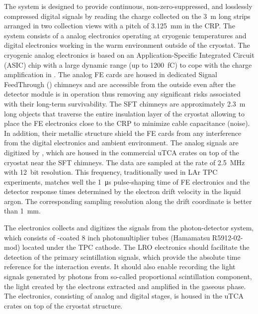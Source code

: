 The  system is designed to provide continuous, non-zero-suppressed, and losslessly compressed digital signals by reading the charge collected on the \SI{3}{m} long strips arranged in two collection views with a pitch of \SI{3.125}{mm} in the CRP. The system consists of a  analog electronics operating at cryogenic temperatures and digital electronics working in the warm environment outside of the cryostat.  The cryogenic  analog electronics is based on an Application-Specific Integrated Circuit (ASIC) chip with a large dynamic range (up to \SI{1200}{fC}) to cope with the charge amplification in . The analog FE cards are housed in dedicated Signal FeedThrough () chimneys and are accessible from the outside even after the detector module is in operation thus removing any significant risks associated with their long-term survivability. The SFT chimneys are approximately \SI{2.3}{m} long objects that traverse the entire insulation layer of the cryostat allowing to place the FE electronics close to the CRP to minimize cable capacitance (noise).  In addition, their metallic structure shield the FE cards from any interference from the digital electronics and ambient environment. The analog signals are digitized by , which are housed in the commercial uTCA crates on top of the cryostat near the SFT chimneys. The data are sampled at the rate of \SI{2.5}{MHz} with \SI{12}{bit} resolution.  This frequency, traditionally used in LAr TPC experiments, matches well the \SI{1}{\micro\second} pulse-shaping time of FE electronics and the detector response times determined by the electron drift velocity in the liquid argon. The corresponding sampling resolution along the drift coordinate is better than \SI{1}{\mm}. 

The  electronics collects and digitizes the signals from the photon-detector system, which consists of -coated \num{8} inch photomultiplier tubes (Hamamatsu R5912-02-mod) located under the TPC cathode. The LRO electronics should facilitate the detection of the primary scintillation signals, which provide the absolute time reference for the interaction events. It should also enable recording the light signals generated by photons from so-called proportional scintillation component, the light created by the electrons extracted and amplified in the gaseous phase. The electronics, consisting of analog and digital stages, is housed in the uTCA crates on top of the cryostat structure.

